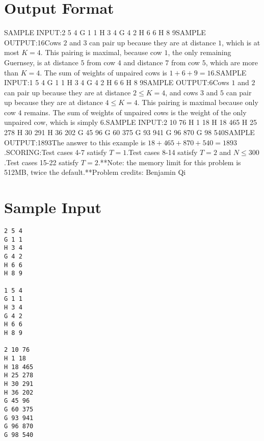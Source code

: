 \documentclass[12pt]{article}
\begin{document}
\section*{Output Format}
SAMPLE INPUT:2 5 4
G 1 1
H 3 4
G 4 2
H 6 6
H 8 9SAMPLE OUTPUT:16Cows $2$ and $3$ can pair up because they are at distance $1$, which is at most
$K = 4$. This pairing is maximal, because cow $1$, the only remaining Guernsey,
is at distance $5$ from cow $4$ and distance $7$ from cow $5$, which are more
than $K = 4$. The sum of weights of unpaired cows is
$1 + 6 + 9 = 16$.SAMPLE INPUT:1 5 4
G 1 1
H 3 4
G 4 2
H 6 6
H 8 9SAMPLE OUTPUT:6Cows $1$ and $2$ can pair up because they are at distance $2 \leq K = 4$, and
cows $3$ and $5$ can pair up because they are at distance $4 \leq K = 4$. This
pairing is maximal because only cow $4$ remains. The sum of weights of
unpaired cows is the weight of the only unpaired cow, which is simply $6$.SAMPLE INPUT:2 10 76
H 1 18
H 18 465
H 25 278
H 30 291
H 36 202
G 45 96
G 60 375
G 93 941
G 96 870
G 98 540SAMPLE OUTPUT:1893The answer to this example is $18+465+870+540=1893$.SCORING:Test cases 4-7 satisfy $T=1$.Test cases 8-14 satisfy $T=2$ and $N\le 300$.Test cases 15-22 satisfy $T=2$.**Note: the memory limit for this problem is 512MB, twice the default.**Problem credits: Benjamin Qi

\section*{Sample Input}
\begin{verbatim}
2 5 4
G 1 1
H 3 4
G 4 2
H 6 6
H 8 9

1 5 4
G 1 1
H 3 4
G 4 2
H 6 6
H 8 9

2 10 76
H 1 18
H 18 465
H 25 278
H 30 291
H 36 202
G 45 96
G 60 375
G 93 941
G 96 870
G 98 540
\end{verbatim}
\end{document}
